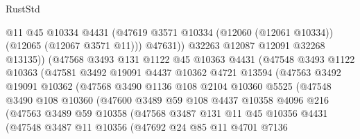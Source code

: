 \begin{lexlean}{RustStd}
\begin{coremodule}
                          @11
                          @45
                          @10334
                          @4431
                          (@47619 @3571 @10334 (@12060 (@12061 @10334)) (@12065 (@12067 @3571 @11)))
                          @47631))
                      @32263
                      @12087
                      @12091
                      @32268
                      @13135))
                  (@47568
                    @3493
                    @131
                    @1122
                    @45
                    @10363
                    @4431
                    (@47548
                      @3493
                      @1122
                      @10363
                      (@47581
                        @3492
                        @19091
                        @4437
                        @10362
                        @4721
                        @13594
                        (@47563
                          @3492
                          @19091
                          @10362
                          (@47568
                            @3490
                            @1136
                            @108
                            @2104
                            @10360
                            @5525
                            (@47548
                              @3490
                              @108
                              @10360
                              (@47600
                                @3489
                                @59
                                @108
                                @4437
                                @10358
                                @4096
                                @216
                                (@47563
                                  @3489
                                  @59
                                  @10358
                                  (@47568
                                    @3487
                                    @131
                                    @11
                                    @45
                                    @10356
                                    @4431
                                    (@47548
                                      @3487
                                      @11
                                      @10356
                                      (@47692
                                        @24
                                        @85
                                        @11
                                        @4701
                                        @7136

\end{coremodule}
\end{lexlean}
